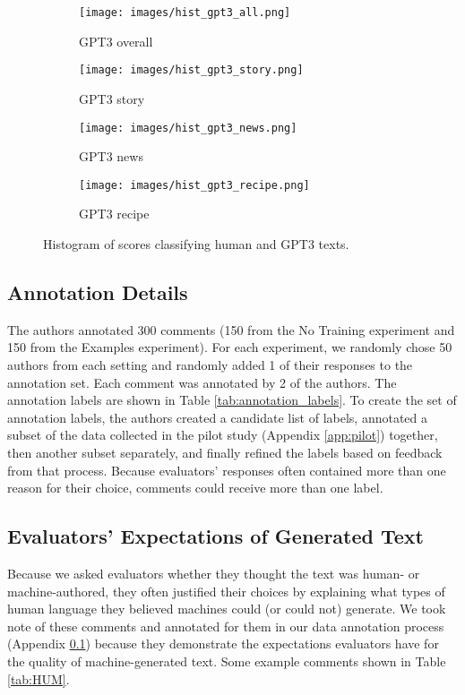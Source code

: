 \begin{figure*}[h]
     \centering
     \begin{subfigure}[b]{0.24\textwidth}
         \centering
         \texttt{[image: images/hist\_gpt3\_all.png]}
         \caption{GPT3 overall}
         \label{fig:hist_gpt3_all}
     \end{subfigure}
     \hfill
     \begin{subfigure}[b]{0.24\textwidth}
         \centering
         \texttt{[image: images/hist\_gpt3\_story.png]}
         \caption{GPT3 story}
         \label{fig:hist_gpt3_story}
     \end{subfigure}
     \hfill
     \begin{subfigure}[b]{0.24\textwidth}
         \centering
         \texttt{[image: images/hist\_gpt3\_news.png]}
         \caption{GPT3 news}
         \label{fig:hist_gpt3_news}
     \end{subfigure}
      \hfill
     \begin{subfigure}[b]{0.24\textwidth}
         \centering
         \texttt{[image: images/hist\_gpt3\_recipe.png]}
         \caption{GPT3 recipe}
         \label{fig:hist_gpt3_recipe}
     \end{subfigure}
        \caption{Histogram of scores classifying human and GPT3 texts.}
        \label{fig:gpt3_histograms}
\end{figure*}

\subsection{Annotation Details}\label{app:annotation}
The authors annotated 300 comments (150 from the No Training experiment and 150 from the Examples experiment).
For each experiment, we randomly chose 50 authors from each setting and randomly added 1 of their responses to the annotation set.
Each comment was annotated by 2 of the authors.
The annotation labels are shown in Table \ref{tab:annotation_labels}.
To create the set of annotation labels, the authors created a candidate list of labels, annotated a subset of the data collected in the pilot study (Appendix \ref{app:pilot}) together, then another subset separately, and finally refined the labels based on feedback from that process.
Because evaluators' responses often contained more than one reason for their choice, comments could receive more than one label.


\subsection{Evaluators' Expectations of Generated Text}\label{app:HUM}
Because we asked evaluators whether they thought the text was human- or machine-authored, they often justified their choices by explaining what types of human language they believed machines could (or could not) generate.
We took note of these comments and annotated for them in our data annotation process (Appendix \ref{app:annotation}) because they demonstrate the expectations evaluators have for the quality of machine-generated text.
Some example comments shown in Table \ref{tab:HUM}.


